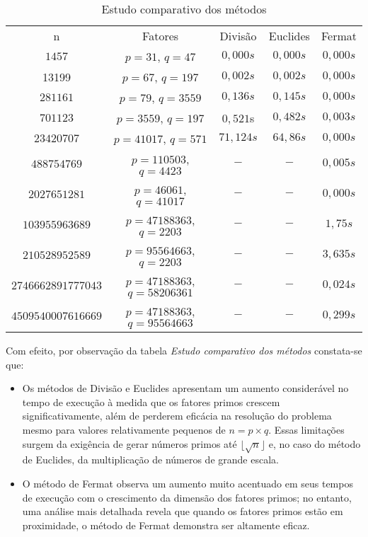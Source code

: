 \begin{table}[h]
\centering
\caption{Estudo comparativo dos métodos}
\label{tab:EstudoMetodo}
\begin{tabular}{>{\columncolor{gray!20}}ccccc}
n & \cellcolor{gray!20}Fatores & \cellcolor{gray!20}Divisão & \cellcolor{gray!20}Euclides & \cellcolor{gray!20}Fermat\\
$1457$ & $p=31$, $q=47$ & $0,\!000s$ &$0,\!000s$&$0,\!000s$\\
13199 &$p=67$, $q=197$&$0,\!002s$ & $0,\!002s$& $$0,\!000s$$\\
$281161$ & $p=79$, $q=3559$  & $0,\!136s$& $0,\!145s$&$0,\!000s$\\
$701123$ & $p=3559$, $q=197$ &$0,\!521$s& $0,\!482s$&$0,\!003s$\\
$23420707$&$p=41017$, $q=571$ & $71,124s$ & $64,86s$&$0,\!000s$\\
$488754769$ & $p=110503$, $q=4423$  & $-$ & $-$&$0,005s$\\
$2027651281$ & $p=46061$, $q=41017$ & $-$ & $-$&$0,\!000s$\\
$103955963689$ & $p=47188363$, $q=2203$  & $-$& $-$&$1,75s$\\
$210528952589$ & $p=95564663$, $q=2203$  & $-$ & $-$&$3,635s$\\
$2746662891777043$ & $p=47188363$, $q=58206361$  & $-$ & $-$&$0,024s$\\
$4509540007616669$ & $p=47188363$, $q=95564663$  & $-$ & $-$&$0,299s$\\
\end{tabular}
\end{table}


Com efeito, por observação da tabela \emph{Estudo comparativo dos métodos} constata-se que:

\begin{itemize}
    \item[] Os métodos de Divisão e Euclides apresentam um aumento considerável no tempo de execução à medida que os fatores primos crescem significativamente, além de perderem eficácia na resolução do problema mesmo para valores relativamente pequenos de $n=p\times q$. Essas limitações surgem da exigência de gerar números primos até $\lfloor \sqrt{n} \rfloor$ e, no caso do método de Euclides, da multiplicação de números de grande escala.
    \item[]O método de Fermat observa um aumento muito acentuado em seus tempos de execução com o crescimento da dimensão dos fatores primos; no entanto, uma análise mais detalhada revela que quando os fatores primos estão em proximidade, o método de Fermat demonstra ser altamente eficaz.
\end{itemize}

